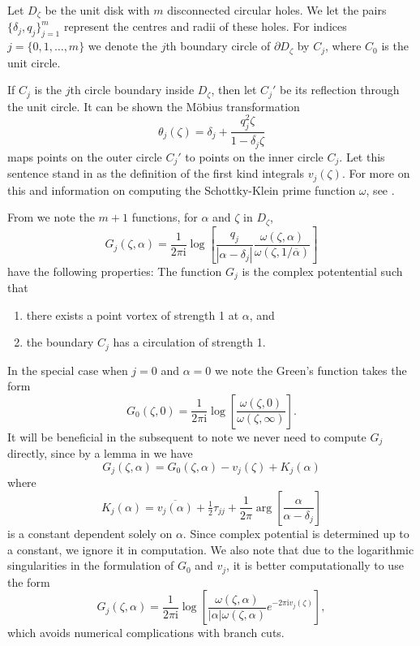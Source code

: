 \documentclass[12pt,fleqn]{article}
\newcommand{\conj}[1]{\overline{#1}}
\newcommand{\uconj}[1]{1/\conj{#1}}
\renewcommand{\i}{\mathrm{i}}
\begin{document}
Let $D_\zeta$ be the unit disk with $m$ disconnected circular holes. We let the pairs $\{\delta_j,q_j\}_{j=1}^m$ represent the centres and radii of these holes. For indices $j=\{0,1,\dots,m\}$ we denote the $j$th boundary circle of $\partial D_\zeta$ by $C_j$, where $C_0$ is the unit circle.

If $C_j$ is the $j$th circle boundary inside $D_\zeta$, then let $C_j'$ be its reflection through the unit circle. It can be shown the M\"obius transformation
\begin{equation*}
  \theta_j(\zeta) = \delta_j + \frac{q_j^2 \zeta}{1 - \conj{\delta_j}\zeta}
\end{equation*}
maps points on the outer circle $C_j'$ to points on the inner circle $C_j$.
Let this sentence stand in as the definition of the first kind integrals $v_j(\zeta)$.
For more on this and information on computing the Schottky-Klein prime function $\omega$, see \cite{primecalc}.

From \cite{greensfunctions} we note the $m+1$ functions, for $\alpha$ and $\zeta$ in $D_\zeta$,
\begin{equation}
  G_j(\zeta,\alpha) = \frac{1}{2\pi\i} \log \left[ \frac{q_j}{|\alpha - \delta_j|} \frac{\omega(\zeta,\alpha)}{\omega(\zeta,\uconj{\alpha})} \right]
  \label{eq:greensfunction}
\end{equation}
have the following properties: The function $G_j$ is the complex potentential such that
\begin{enumerate}
  \item there exists a point vortex of strength 1 at $\alpha$, and
  \item the boundary $C_j$ has a circulation of strength 1.
\end{enumerate}
In the special case when $j=0$ and $\alpha=0$ we note the Green's function takes the form
\begin{equation*}
  G_0(\zeta,0) = \frac{1}{2\pi\i} \log\left[ \frac{\omega(\zeta,0)}{\omega(\zeta,\infty)} \right].
\end{equation*}
It will be beneficial in the subsequent to note we never need to compute $G_j$ directly, since by a lemma in \cite{primecalc} we have
\begin{equation*}
  G_j(\zeta,\alpha) = G_0(\zeta,\alpha) - v_j(\zeta) + K_j(\alpha)
\end{equation*}
where
\begin{equation*}
  K_j(\alpha) = \conj{v_j(\alpha)} + \tfrac{1}{2}\tau_{jj} + \frac{1}{2\pi}\arg\left[ \frac{\alpha}{\alpha - \delta_j} \right]
\end{equation*}
is a constant dependent solely on $\alpha$. Since complex potential is determined up to a constant, we ignore it in computation. We also note that due to the logarithmic singularities in the formulation of $G_0$ and $v_j$, it is better computationally to use the form
\begin{equation*}
  G_j(\zeta,\alpha) = \frac{1}{2\pi\i} \log\left[ \frac{\omega(\zeta,\alpha)}{|\alpha|\omega(\zeta,\alpha)} e^{-2\pi\i v_j(\zeta)} \right],
\end{equation*}
which avoids numerical complications with branch cuts.
\end{document}
